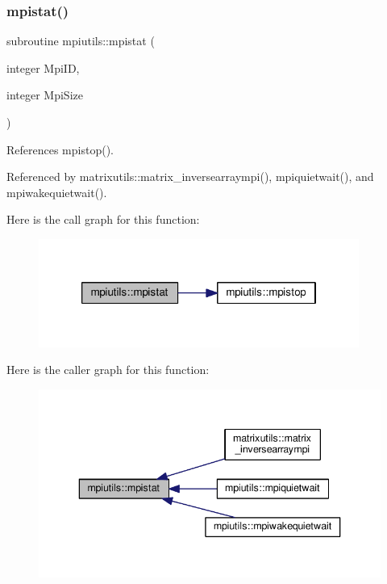 \subsubsection{\texorpdfstring{mpistat()}{mpistat()}}
{\footnotesize\ttfamily subroutine mpiutils\+::mpistat (\begin{DoxyParamCaption}\item[{integer}]{Mpi\+ID,  }\item[{integer}]{Mpi\+Size }\end{DoxyParamCaption})}



References mpistop().



Referenced by matrixutils\+::matrix\+\_\+inversearraympi(), mpiquietwait(), and mpiwakequietwait().

Here is the call graph for this function\+:
\nopagebreak
\begin{figure}[H]
\begin{center}
\leavevmode
\includegraphics[width=298pt]{namespacempiutils_af717f5183b6db768a0a9517d4737805e_cgraph}
\end{center}
\end{figure}
Here is the caller graph for this function\+:
\nopagebreak
\begin{figure}[H]
\begin{center}
\leavevmode
\includegraphics[width=340pt]{namespacempiutils_af717f5183b6db768a0a9517d4737805e_icgraph}
\end{center}
\end{figure}
\mbox{\label{namespacempiutils_a23720e4e8b635dab4b67172618aa77e5}} 
